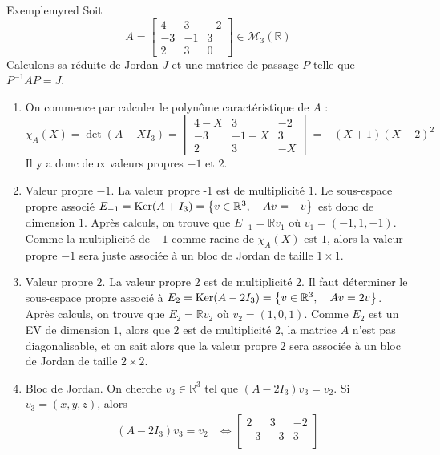     \begin{omed}{Exemple}{myred}
        Soit 
        \[ A = \begin{bmatrix}
            4 & 3 & -2 \\
            -3 & -1 & 3 \\
            2 & 3 & 0 
        \end{bmatrix} \in \mathcal{M}_3(\mathbb{R}) \]   
        Calculons sa réduite de Jordan $J$ et une matrice de passage $P$ telle que $P^{-1} A P = J$.
        \begin{enumerate}
            \item On commence par calculer le polynôme caractéristique de $A$ : 
            \[ \chi_A(X) = \det(A - X I_3) = \begin{vmatrix}
                4 - X & 3 & -2 \\
                -3 & -1 -X & 3 \\
                2 & 3 & -X
            \end{vmatrix} = -(X + 1)(X - 2)^2 \]   
            Il y a donc deux valeurs propres $-1$ et $2$. 
            \item Valeur propre $-1$. \quad La valeur propre -1 est de multiplicité $1$. Le sous-espace propre associé $E_{-1} = \operatorname{Ker}(A + I_3) = \left\{v \in \mathbb{R}^3, \quad A v = -v\right\}$ est donc de dimension $1$. Après calculs, on trouve que $E_{-1} = \mathbb{R} v_1$ où $v_1 = (-1, 1 ,-1)$. Comme la multiplicité de $-1$ comme racine de $\chi_{A}(X)$ est $1$, alors la valeur propre $-1$ sera juste associée à un bloc de Jordan de taille $1 \times 1$.
            \item Valeur propre $2$. \quad La valeur propre $2$ est de multiplicité $2$. Il faut déterminer le sous-espace propre associé à $E_2 = \operatorname{Ker}(A - 2 I_3) = \left\{v \in \mathbb{R}^3, \quad A v = 2 v \right\}$. Après calculs, on trouve que $E_2 = \mathbb{R} v_2$ où $v_2 = (1,0,1)$. Comme $E_2$ est un EV de dimension $1$, alors que $2$ est de multiplicité $2$, la matrice $A$ n’est pas diagonalisable, et on sait alors que la valeur propre $2$ sera associée à un bloc de Jordan de taille $2 \times 2$. 
            \item Bloc de Jordan. \quad On cherche $v_3 \in \mathbb{R}^3$ tel que $(A - 2I_3) v_3 = v_2$. Si $v_3 = (x,y,z)$, alors 
            \begin{align*}
                (A - 2 I_3) v_3 = v_2 &\iff \begin{bmatrix}
                    2 & 3 & -2 \\
                    -3 & -3 & 3 \\

\end{bmatrix}
\end{align*}
\end{enumerate}
\end{omed}
